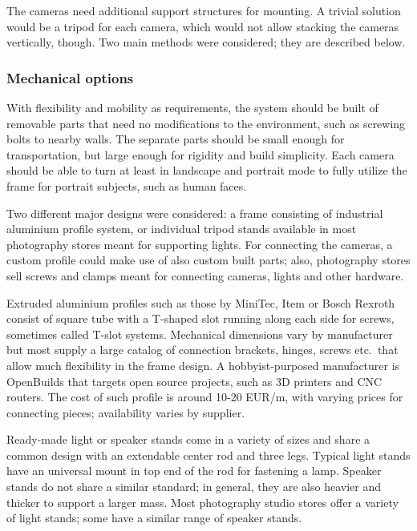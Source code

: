The cameras need additional support structures for mounting.
A trivial solution would be a tripod for each camera, which would not allow stacking the cameras vertically, though.
Two main methods were considered; they are described below.

\subsubsection{Mechanical options}

With flexibility and mobility as requirements, the system should be built of removable parts that need no modifications to the environment, such as screwing bolts to nearby walls.
The separate parts should be small enough for transportation, but large enough for rigidity and build simplicity.
Each camera should be able to turn at least in landscape and portrait mode to fully utilize the frame for portrait subjects, such as human faces.

Two different major designs were considered: a frame consisting of industrial aluminium profile system, or individual tripod stands available in most photography stores meant for supporting lights.
For connecting the cameras, a custom profile could make use of also custom built parts; also, photography stores sell screws and clamps meant for connecting cameras, lights and other hardware.

Extruded aluminium profiles such as those by MiniTec, Item or Bosch Rexroth consist of square tube with a T-shaped slot running along each side for screws, sometimes called T-slot systems.
Mechanical dimensions vary by manufacturer but most supply a large catalog of connection brackets, hinges, screws etc.\ that allow much flexibility in the frame design.
A hobbyist-purposed manufacturer is OpenBuilds that targets open source projects, such as 3D printers and CNC routers.
The cost of such profile is around 10-20 EUR/m, with varying prices for connecting pieces; availability varies by supplier.

Ready-made light or speaker stands come in a variety of sizes and share a common design with an extendable center rod and three legs.
Typical light stands have an universal mount in top end of the rod for fastening a lamp.
Speaker stands do not share a similar standard; in general, they are also heavier and thicker to support a larger mass.
Most photography studio stores offer a variety of light stands; some have a similar range of speaker stands.

